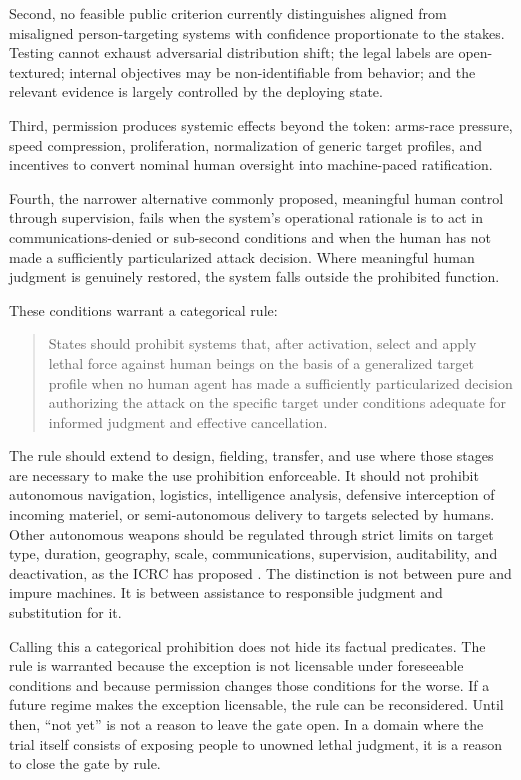 \documentclass[11pt]{article}
\begin{document}
Second, no feasible public criterion currently distinguishes aligned from misaligned person-targeting systems with confidence proportionate to the stakes. Testing cannot exhaust adversarial distribution shift; the legal labels are open-textured; internal objectives may be non-identifiable from behavior; and the relevant evidence is largely controlled by the deploying state.

Third, permission produces systemic effects beyond the token: arms-race pressure, speed compression, proliferation, normalization of generic target profiles, and incentives to convert nominal human oversight into machine-paced ratification.

Fourth, the narrower alternative commonly proposed, meaningful human control through supervision, fails when the system's operational rationale is to act in communications-denied or sub-second conditions and when the human has not made a sufficiently particularized attack decision. Where meaningful human judgment is genuinely restored, the system falls outside the prohibited function.

These conditions warrant a categorical rule:

\begin{quote}
States should prohibit systems that, after activation, select and apply lethal force against human beings on the basis of a generalized target profile when no human agent has made a sufficiently particularized decision authorizing the attack on the specific target under conditions adequate for informed judgment and effective cancellation.
\end{quote}

The rule should extend to design, fielding, transfer, and use where those stages are necessary to make the use prohibition enforceable. It should not prohibit autonomous navigation, logistics, intelligence analysis, defensive interception of incoming materiel, or semi-autonomous delivery to targets selected by humans. Other autonomous weapons should be regulated through strict limits on target type, duration, geography, scale, communications, supervision, auditability, and deactivation, as the ICRC has proposed \citep{icrc2021}. The distinction is not between pure and impure machines. It is between assistance to responsible judgment and substitution for it.

Calling this a categorical prohibition does not hide its factual predicates. The rule is warranted because the exception is not licensable under foreseeable conditions and because permission changes those conditions for the worse. If a future regime makes the exception licensable, the rule can be reconsidered. Until then, ``not yet'' is not a reason to leave the gate open. In a domain where the trial itself consists of exposing people to unowned lethal judgment, it is a reason to close the gate by rule.
\end{document}
